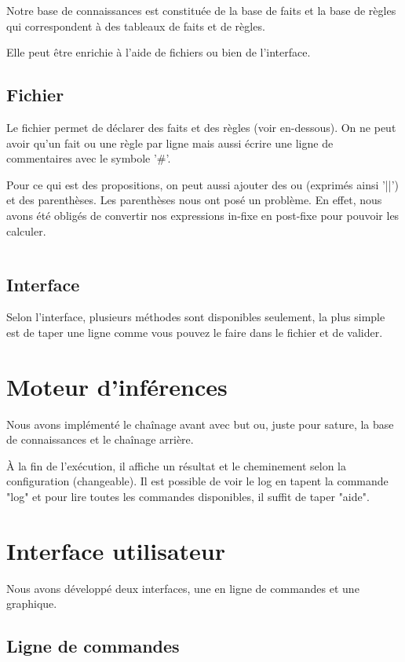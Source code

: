 \documentclass[a4paper, 11pt]{article}
\begin{document}
Notre base de connaissances est constituée de la base de faits et la base de règles qui correspondent à des tableaux de faits et de règles.

Elle peut être enrichie à l'aide de fichiers ou bien de l'interface.

\subsection{Fichier}

Le fichier permet de déclarer des faits et des règles (voir en-dessous).
On ne peut avoir qu'un fait ou une règle par ligne mais aussi écrire une ligne de commentaires avec le symbole '\#'.

Pour ce qui est des propositions, on peut aussi ajouter des ou (exprimés ainsi '||') et des parenthèses. Les parenthèses nous ont posé un problème. En effet, nous avons été obligés de convertir nos expressions in-fixe en post-fixe pour pouvoir les calculer.  

\inputminted{sql}{../maladies.txt}

\subsection{Interface}

Selon l'interface, plusieurs méthodes sont disponibles seulement, la plus simple est de taper une ligne comme vous pouvez le faire dans le fichier et de valider.

\section{Moteur d'inférences}

Nous avons implémenté le chaînage avant avec but ou, juste pour sature, la base de connaissances et le chaînage arrière.

À la fin de l'exécution, il affiche un résultat et le cheminement selon la configuration (changeable). Il est possible de voir le log en tapent la commande "log" et pour lire toutes les commandes disponibles, il suffit de taper "aide".

\section{Interface utilisateur}

Nous avons développé deux interfaces, une en ligne de commandes et une graphique. 

\subsection{Ligne de commandes}
\end{document}
